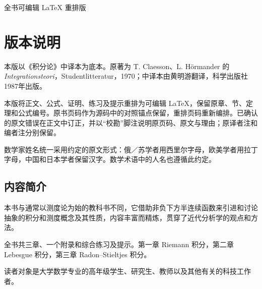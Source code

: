 \documentclass[11pt,twoside,openany]{book}
\begin{document}
\color{BellaInk}\frontmatter
\thispagestyle{empty}\vspace*{20mm}
\par\vspace{16mm}
\par\vspace{8mm}
\par\vspace{20mm}
\par\vspace{5mm}
\par\vfill
\noindent{\color{BellaBlue}\rule{\textwidth}{.6pt}}\par\vspace{5mm}
\par\noindent 全书可编辑 LaTeX 重排版\par\vspace*{12mm}
\chapter*{版本说明}
本版以《积分论》中译本为底本。原著为 T. Claesson、L. Hörmander 的 \textit{Integrationsteori}，Studentlitteratur，1970；中译本由黄明游翻译，科学出版社1987年出版。

本版将正文、公式、证明、练习及提示重排为可编辑 LaTeX，保留原章、节、定理和公式编号。原书页码作为源码中的对照锚点保留，重排页码重新编排。已确认的原文错误在正文中订正，并以“校勘”脚注说明原页码、原文与理由；原译者注和编者注分别保留。

数学家姓名统一采用约定的原文形式：俄／苏学者用西里尔字母，欧美学者用拉丁字母，中国和日本学者保留汉字。数学术语中的人名也遵循此约定。

\section*{内容简介}
本书与通常以测度论为始的教科书不同，它借助非负下方半连续函数来引进和讨论抽象的积分和测度概念及其性质，内容丰富而精炼，贯穿了近代分析学的观点和方法。

全书共三章、一个附录和综合练习及提示。第一章 Riemann 积分，第二章 Lebesgue 积分，第三章 Radon--Stieltjes 积分。

读者对象是大学数学专业的高年级学生、研究生、教师以及其他有关的科技工作者。

\clearpage\hypertarget{contents}{}{\fontsize{9.5}{11.5}\selectfont\setlength{\parskip}{0pt}\tableofcontents}\mainmatter






\end{document}
